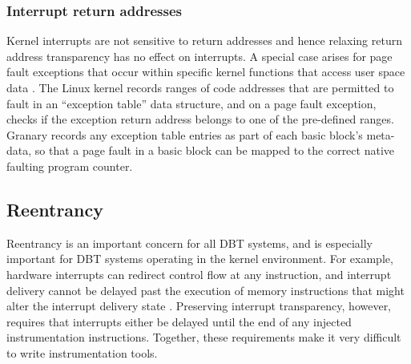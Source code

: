 \documentclass[preprint]{sigplanconf}
\begin{document}
\subsubsection{Interrupt return addresses}\label{sec:interrupt_return_address_transparency}
Kernel interrupts are not sensitive to return addresses and hence relaxing return address transparency has no effect on interrupts. A special case arises for page fault exceptions that occur within specific kernel functions that access user space data \cite{btkernel}. The Linux kernel records ranges of code addresses that are permitted to fault in an ``exception table'' data structure, and on a page fault exception, checks if the exception return address belongs to one of the pre-defined ranges. Granary records any exception table entries as part of each basic block's meta-data, so that a page fault in a basic block can be mapped to the correct native faulting program counter.


\subsection{Reentrancy}
Reentrancy is an important concern for all DBT systems, and is especially important for DBT systems operating in the kernel environment. For example, hardware interrupts can redirect control flow at any instruction, and interrupt delivery cannot be delayed past the execution of memory instructions that might alter the interrupt delivery state \cite{DRK}. Preserving interrupt transparency, however, requires that interrupts either be delayed until the end of any injected instrumentation instructions. Together, these requirements make it very difficult to write instrumentation tools.
\end{document}
